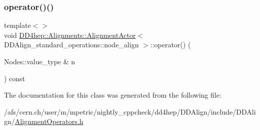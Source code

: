 \subsubsection{\texorpdfstring{operator()()}{operator()()}\hspace{0.1cm}{\footnotesize\ttfamily [5/5]}}
{\footnotesize\ttfamily template$<$$>$ \\
void \hyperlink{class_d_d4hep_1_1_alignments_1_1_alignment_actor}{D\+D4hep\+::\+Alignments\+::\+Alignment\+Actor}$<$ D\+D\+Align\+\_\+standard\+\_\+operations\+::node\+\_\+align $>$\+::operator() (\begin{DoxyParamCaption}\item[{Nodes\+::value\+\_\+type \&}]{n }\end{DoxyParamCaption}) const}



The documentation for this class was generated from the following file\+:\begin{DoxyCompactItemize}
\item 
/afs/cern.\+ch/user/m/mpetric/nightly\+\_\+cppcheck/dd4hep/\+D\+D\+Align/include/\+D\+D\+Align/\hyperlink{_alignment_operators_8h}{Alignment\+Operators.\+h}\end{DoxyCompactItemize}
